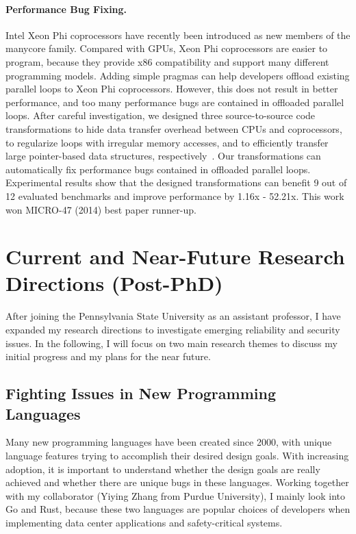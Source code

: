 \documentclass[10pt]{article}
\begin{document}
\paragraph{Performance Bug Fixing.}
Intel Xeon Phi coprocessors have recently been introduced 
as new members of the manycore family.
Compared with GPUs, Xeon Phi coprocessors are easier to program,
because they provide x86 compatibility and support many different programming models.
Adding simple pragmas can help developers offload existing parallel loops 
to Xeon Phi coprocessors. 
However, this does not result in better performance, 
and too many performance bugs are contained in 
offloaded parallel loops. 
After careful investigation, we designed three source-to-source code transformations to 
hide data transfer overhead between CPUs and coprocessors, 
to regularize loops with irregular memory accesses, 
and to efficiently transfer large pointer-based data structures, respectively~\cite{Song14MICRO}.
Our transformations can automatically fix performance bugs contained in offloaded parallel loops. 
Experimental results show that the designed transformations can benefit 9 
out of 12 evaluated benchmarks and improve performance by 1.16x - 52.21x. 
This work won MICRO-47 (2014) best paper runner-up.


\vspace{-.1in}
\section{Current and Near-Future Research Directions (Post-PhD)}
After joining the Pennsylvania State University as an assistant professor,
I have expanded my research directions to investigate
emerging reliability and security issues.  
In the following, I will focus on two main research themes 
to discuss my initial progress and my plans for the near future. 

\vspace{-.1in}
\subsection{Fighting Issues in New Programming Languages}
Many new programming languages have been created since 2000, 
with unique language features trying to accomplish their desired design goals.
With increasing adoption, it is important to understand 
whether the design goals are really achieved 
and whether there are unique bugs in these languages. 
Working together with my collaborator (Yiying Zhang from Purdue University), 
I mainly look into Go and Rust, because 
these two languages are popular choices 
of developers when implementing 
data center applications and safety-critical systems. 
 
\end{document}

